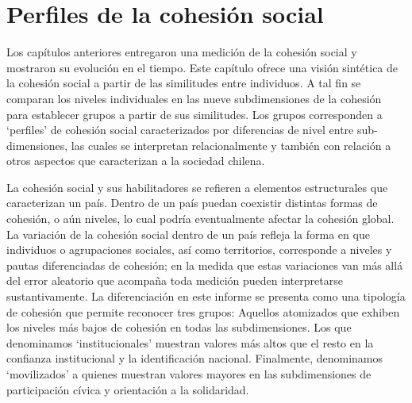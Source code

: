 \documentclass[
  12pt,
]{book}
\begin{document}
\hypertarget{perfiles-de-la-cohesiuxf3n-social}{%
\section{Perfiles de la cohesión social}\label{perfiles-de-la-cohesiuxf3n-social}}

Los capítulos anteriores entregaron una medición de la cohesión social y mostraron su evolución en el tiempo. Este capítulo ofrece una visión sintética de la cohesión social a partir de las similitudes entre individuos. A tal fin se comparan los niveles individuales en las nueve subdimensiones de la cohesión para establecer grupos a partir de sus similitudes. Los grupos corresponden a `perfiles' de cohesión social caracterizados por diferencias de nivel entre sub-dimensiones, las cuales se interpretan relacionalmente y también con relación a otros aspectos que caracterizan a la sociedad chilena.

La cohesión social y sus habilitadores se refieren a elementos estructurales que caracterizan un país. Dentro de un país puedan coexistir distintas formas de cohesión, o aún niveles, lo cual podría eventualmente afectar la cohesión global. La variación de la cohesión social dentro de un país refleja la forma en que individuos o agrupaciones sociales, así como territorios, corresponde a niveles y pautas diferenciadas de cohesión; en la medida que estas variaciones van más allá del error aleatorio que acompaña toda medición pueden interpretarse sustantivamente. La diferenciación en este informe se presenta como una tipología de cohesión que permite reconocer tres grupos: Aquellos atomizados que exhiben los niveles más bajos de cohesión en todas las subdimensiones. Los que denominamos `institucionales' muestran valores más altos que el resto en la confianza institucional y la identificación nacional. Finalmente, denominamos `movilizados' a quienes muestran valores mayores en las subdimensiones de participación cívica y orientación a la solidaridad.
\end{document}

